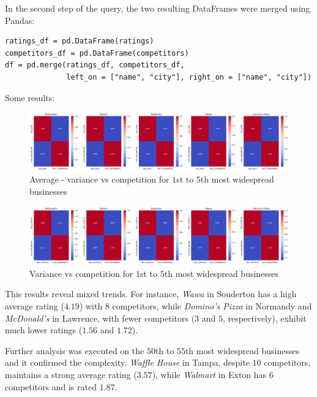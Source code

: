 \documentclass{Configuration_Files/PoliMi3i_thesis}
\begin{document}
In the second step of the query, the two resulting DataFrames were merged using Pandas:

\bigskip 

\begin{verbatim}
ratings_df = pd.DataFrame(ratings)
competitors_df = pd.DataFrame(competitors)
df = pd.merge(ratings_df, competitors_df, 
              left_on = ["name", "city"], right_on = ["name", "city"])
\end{verbatim}

\bigskip

Some results:
\bigskip

\begin{figure}[H]
    \centering
    \includegraphics[width=\columnwidth]{imgs/query_4b.png}
    \caption{Average - variance vs competition for $1$st to $5$th most widespread businesses}
    \label{fig:query_4b}
\end{figure}

\bigskip

\begin{figure}[H]
    \centering
    \includegraphics[width=\columnwidth]{imgs/query_4e.png}
    \caption{Variance vs competition for $1$st to $5$th most widespread businesses}
    \label{fig:query_4e}
\end{figure}

\bigskip

This results reveal mixed trends. For instance, \textit{Wawa} in Souderton has a high average rating ($4.19$) with $8$ competitors, while \textit{Domino's Pizza} in Normandy and \textit{McDonald's} in Lawrence, with fewer competitors ($3$ and $5$, respectively), exhibit much lower ratings ($1.56$ and $1.72$). 

Further analysis was executed on the $50$th to $55$th most widespread businesses and it confirmed the complexity. \textit{Waffle House} in Tampa, despite $10$ competitors, maintains a strong average rating ($3.57$), while \textit{Walmart} in Exton has $6$ competitors and is rated $1.87$. 
\end{document}
